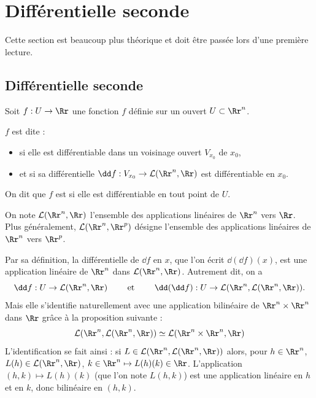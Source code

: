 \section{Différentielle seconde}

Cette section est beaucoup plus théorique et doit être passée lors d'une première lecture.

\subsection{Différentielle seconde}


Soit $f : U \to \Rr$ une fonction $f$ définie sur un ouvert $U \subset \Rr^n$.
\begin{definition}{}{}
$f$ est dite  :
    \begin{itemize}
        \item si elle est différentiable dans un voisinage ouvert $V_{x_0}$ de $x_0$,
        \item et si sa différentielle $\dd f : V_{x_0} \to \mathcal{L}(\Rr^n,\Rr)$ est différentiable en $x_0$.
    \end{itemize}
    On dit que $f$ est  si elle est différentiable en tout point de $U$.
\end{definition} 


On note $\mathcal{L}(\Rr^n,\Rr)$ l'ensemble des applications linéaires de $\Rr^n$ vers $\Rr$.
Plus généralement, $\mathcal{L}(\Rr^n,\Rr^p)$ désigne l'ensemble des applications linéaires de $\Rr^n$ vers $\Rr^p$.

Par sa définition, la différentielle de $\dd f$ en $x$, que l'on écrit $\dd(\dd f)(x)$, est une application linéaire de $\Rr^n$ dans $\mathcal{L}(\Rr^n,\Rr)$. Autrement dit, on a
$$
\dd f : U \to \mathcal{L}(\Rr^n,\Rr) 
\qquad \text{ et } \qquad
\dd (\dd f) : U \to \mathcal{L} (\Rr^n,\mathcal{L}(\Rr^n,\Rr)).
$$
Mais elle s'identifie naturellement avec une application 
bilinéaire de $\Rr^n \times \Rr^n$ dans $\Rr$ grâce à la proposition suivante :
$$\mathcal{L} (\Rr^n,\mathcal{L}(\Rr^n,\Rr)) \simeq 
\mathcal{L} (\Rr^n \times \Rr^n,\Rr)$$
L'identification se fait ainsi : 
si $L \in \mathcal{L} (\Rr^n,\mathcal{L}(\Rr^n,\Rr))$
alors, pour $h \in \Rr^n$, $L(h) \in \mathcal{L}(\Rr^n,\Rr)$, $k \in \Rr^n \mapsto L(h)(k) \in \Rr$.
L'application $(h,k) \mapsto L(h)(k)$ (que l'on note $L(h,k)$) est une application linéaire en $h$ et en $k$, donc bilinéaire en $(h,k)$.

